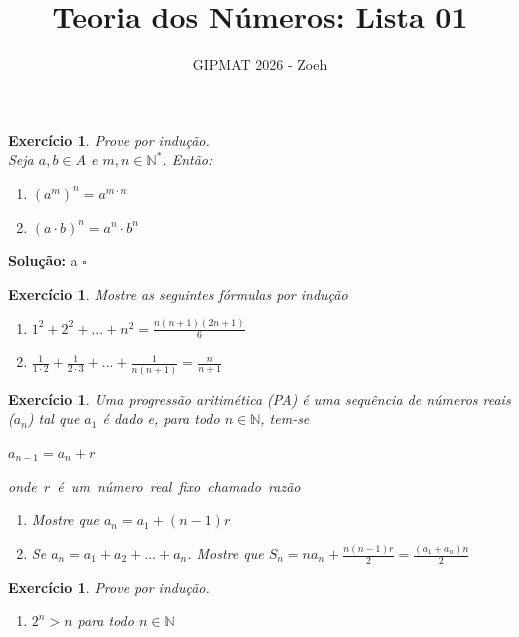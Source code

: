 \documentclass[
  12pt,
  openright,
  a4paper,
  twoside,
  english,
  brazil,
]{article}
\title{Teoria dos Números: Lista 01}
\author{GIPMAT 2026 - Zoeh}
\date{}
\newcommand{\cqd}{\hfill $\square$}
\newenvironment{solution}[1][]{\noindent\textbf{Solução#1:} }{\cqd}
\newcounter{ex}
\newtheorem{exercise}[ex]{Exercício}
\begin{document}
\maketitle

\begin{exercise}
  Prove por indução. \\
  Seja $a, b\in A$ e $m, n\in\mathbb N^*$. Então:

  \begin{enumerate}
    \item[(a)] $(a^m)^n=a^{m\cdot n}$
    \item[(b)] $(a\cdot b)^n=a^n \cdot b^n$
  \end{enumerate}
\end{exercise}

\begin{solution}
  a
\end{solution}

\begin{exercise}
  Mostre as seguintes fórmulas por indução

  \begin{enumerate}
    \item[(a)] $1^2+2^2+...+n^2=\frac{n(n+1)(2n+1)}{6}$
    \item[(b)] $\frac{1}{1\cdot 2}+\frac{1}{2\cdot
      3}+...+\frac{1}{n(n+1)}=\frac{n}{n+1}$
  \end{enumerate}
\end{exercise}

\begin{exercise}
  Uma progressão aritimética (PA) é uma sequência de números reais
  ($a_n$) tal que $a_1$ é dado e, para todo $n\in\mathbb N$, tem-se

  {\center$a_{n-1}=a_n+r$\endcenter}

  \hbox{onde $r$ é um número real fixo chamado razão}

  \begin{enumerate}
    \item[(a)] Mostre que $a_n=a_1+(n-1)r$
    \item[(b)] Se $a_n=a_1+a_2+...+a_n$. Mostre que
      $S_n=na_n+\frac{n(n-1)r}{2}=\frac{(a_1+a_n)n}{2}$
  \end{enumerate}
\end{exercise}

\begin{exercise}
  Prove por indução.

  \begin{enumerate}
    \item[(a)] $2^n>n$ para todo $n\in\mathbb N$
  \end{enumerate}
\end{exercise}
\end{document}
